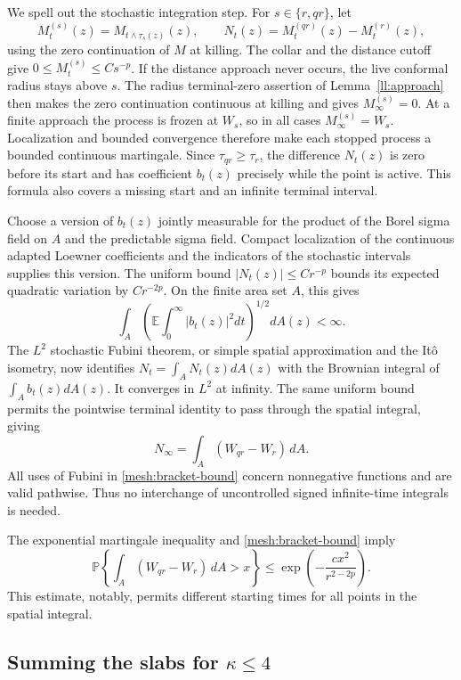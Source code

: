 \documentclass[11pt]{article}
\theoremstyle{definition}
\theoremstyle{remark}
\numberwithin{equation}{section}
\begin{document}
We spell out the stochastic integration step.  For $s\in\{r,qr\}$,
let
\[
 M_t^{(s)}(z)=M_{t\wedge\tau_s(z)}(z),
 \qquad N_t(z)=M_t^{(qr)}(z)-M_t^{(r)}(z),
\]
using the zero continuation of $M$ at killing.  The collar and the
distance cutoff give $0\le M_t^{(s)}\le Cs^{-p}$.
If the distance approach never occurs, the live conformal radius
stays above $s$.  The radius terminal-zero assertion of
Lemma~\ref{ll:approach} then makes the zero continuation continuous
at killing and gives $M_\infty^{(s)}=0$.  At a finite approach the
process is frozen at $W_s$, so in all cases $M_\infty^{(s)}=W_s$.
Localization and bounded convergence therefore make each
stopped process a bounded continuous martingale.  Since
$\tau_{qr}\ge\tau_r$, the difference $N_t(z)$ is zero before its
start and has coefficient $b_t(z)$ precisely while the point is
active.  This formula also covers a missing start and an infinite
terminal interval.

Choose a version of $b_t(z)$ jointly measurable for the product of
the Borel sigma field on $A$ and the predictable sigma field.
Compact localization of the continuous adapted Loewner coefficients
and the indicators of the stochastic intervals supplies this version.  The
uniform bound $|N_t(z)|\le Cr^{-p}$ bounds its expected quadratic
variation by $Cr^{-2p}$.  On the finite area set $A$, this gives
\[
 \int_A\left(\mathbb E\int_0^\infty |b_t(z)|^2dt\right)^{1/2}
 dA(z)<\infty.
\]
The $L^2$ stochastic Fubini theorem, or simple spatial approximation
and the It\^o isometry, now identifies
$N_t=\int_A N_t(z)dA(z)$ with the Brownian integral of
$\int_A b_t(z)dA(z)$.  It converges in $L^2$ at infinity.  The same
uniform bound permits the pointwise terminal identity to pass through
the spatial integral, giving
\[
 N_\infty=\int_A(W_{qr}-W_r)\,dA.
\]
All uses of Fubini in \eqref{mesh:bracket-bound} concern nonnegative
functions and are valid pathwise.  Thus no interchange of
uncontrolled signed infinite-time integrals is needed.

The exponential martingale inequality and
\eqref{mesh:bracket-bound} imply
\begin{equation}
 \mathbb P\left\{\int_A(W_{qr}-W_r)\,dA>x\right\}
 \le\exp\left(-\frac{c x^2}{r^{2-2p}}\right).
 \label{mesh:slab-tail}
\end{equation}
This estimate, notably, permits different starting times for all
points in the spatial integral.

\subsection{Summing the slabs for
\texorpdfstring{$\kappa\le4$}{kappa at most four}}
\end{document}
